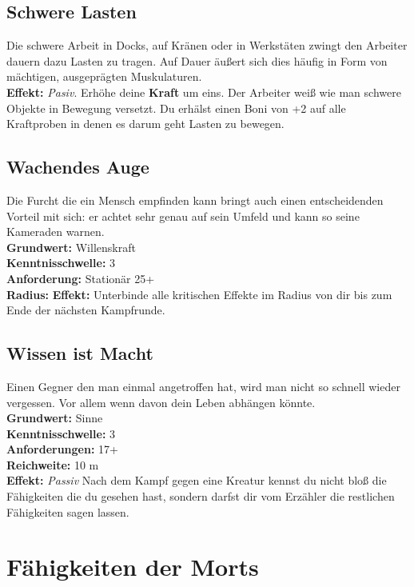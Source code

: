 \subsection*{Schwere Lasten} \label{sk:schwere_lasten}
Die schwere Arbeit in Docks, auf Kränen oder in Werkstäten zwingt den Arbeiter dauern dazu Lasten zu tragen. Auf Dauer äußert sich dies häufig in Form von mächtigen, ausgeprägten Muskulaturen.\\
\textbf{Effekt:} \textit{Pasiv}. Erhöhe deine \textbf{Kraft} um eins. Der Arbeiter weiß wie man schwere Objekte in Bewegung versetzt. Du erhälst einen Boni von +2 auf alle Kraftproben in denen es darum geht Lasten zu bewegen.

\subsection*{Wachendes Auge} \label{sk:wachendes_auge}
Die Furcht die ein Mensch empfinden kann bringt auch einen entscheidenden Vorteil mit sich: er achtet sehr genau auf sein Umfeld und kann so seine Kameraden warnen. \\
\textbf{Grundwert:} Willenskraft \\
\textbf{Kenntnisschwelle:} 3 \\
\textbf{Anforderung:} Stationär 25+ \\
\textbf{Radius:}
\textbf{Effekt:} Unterbinde alle kritischen Effekte im Radius von dir bis zum Ende der nächsten Kampfrunde.

\subsection*{Wissen ist Macht} \label{sk:wissenistmacht}
Einen Gegner den man einmal angetroffen hat, wird man nicht so schnell wieder vergessen. Vor allem wenn davon dein Leben abhängen könnte.\\
\textbf{Grundwert:} Sinne \\
\textbf{Kenntnisschwelle:} 3 \\
\textbf{Anforderungen:} 17+ \\
\textbf{Reichweite:} 10 m \\
\textbf{Effekt:} \textit{Passiv} Nach dem Kampf gegen eine Kreatur kennst du nicht bloß die Fähigkeiten die du gesehen hast, sondern darfst dir vom Erzähler die restlichen Fähigkeiten sagen lassen.


\section{Fähigkeiten der Morts} \label{mortsskills}

